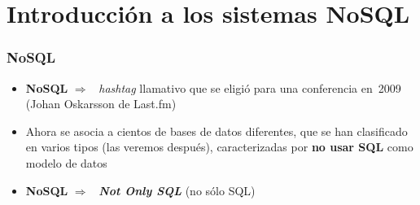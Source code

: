 \documentclass[14pt]{beamer}
\newcommand{\ra}{{\color{blue} $\Rightarrow${}~{}}}
\begin{document}




\section{Introducción a los sistemas NoSQL}

\begin{frame}
  \frametitle{NoSQL}
\begin{itemize}
\item {\bf NoSQL} \ra{} {\em hashtag\/} llamativo que se
  eligió para una conferencia en~2009 (Johan Oskarsson de Last.fm)
\item Ahora se asocia a cientos de bases de datos diferentes,
  que se han clasificado en varios tipos (las veremos después),
  caracterizadas por {\bf no usar SQL} como modelo de datos
\item {\bf NoSQL} \ra{} {\bfseries\itshape Not Only SQL} (no sólo SQL)
  \end{itemize}
\end{frame}


\end{document}
